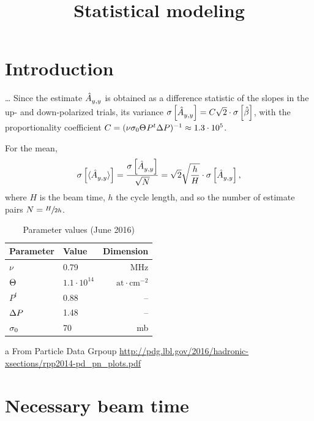 \documentclass{article}
\newcommand{\Dim}[1]{\mathrm{#1}}
\begin{document}
\title{Statistical modeling}
\maketitle

\section*{Introduction}
\dots
Since the estimate $\Ayy*$ is obtained as a difference statistic of the slopes in the up- and down-polarized trials, its variance $\SE{\Ayy*} = C\sqrt{2}\cdot\SE{\slp*}$, with the proportionality coefficient $C = (\nu\CS[0]\Thick P^t\DP)^{-1} \approx 1.3\cdot 10^{5}$. 

For the mean, 
\begin{equation}\label{eq:AvgAyySE}
	\SE{\avg{\Ayy*}} = \frac{\SE{\Ayy*}}{\sqrt N} = \sqrt{2}\sqrt{\frac hH}\cdot\SE{\Ayy*},
\end{equation}
where $H$ is the beam time, $h$ the cycle length, and so the number of estimate pairs $N = \sfrac{H}{2h}$.

\begin{table}
\centering
\caption{Parameter values (June 2016)\label{tbl:Param}}
\begin{threeparttable}[h]
\begin{tabular}{llr}
\hline\hline
Parameter					& Value 				& Dimension \\
\hline
$\nu$						& 0.79 					& MHz \\
$\Thick$					& $1.1\cdot 10^{14}$	& $\Dim{at\cdot cm^{-2}}$ \\
$P^t$						& 0.88					& -- \\
$\DP$						& 1.48					& -- \\
$\CS[0]$\tnote{a}			& 70					& mb\\
\hline
\end{tabular}
\begin{tablenotes}
	\item[a]{From Particle Data Grpoup \url{http://pdg.lbl.gov/2016/hadronic-xsections/rpp2014-pd_pn_plots.pdf}}
\end{tablenotes}
\end{threeparttable}
\end{table}



\section{Necessary beam time}
\newcommand{\Tint}{\Delta t}
\end{document}
